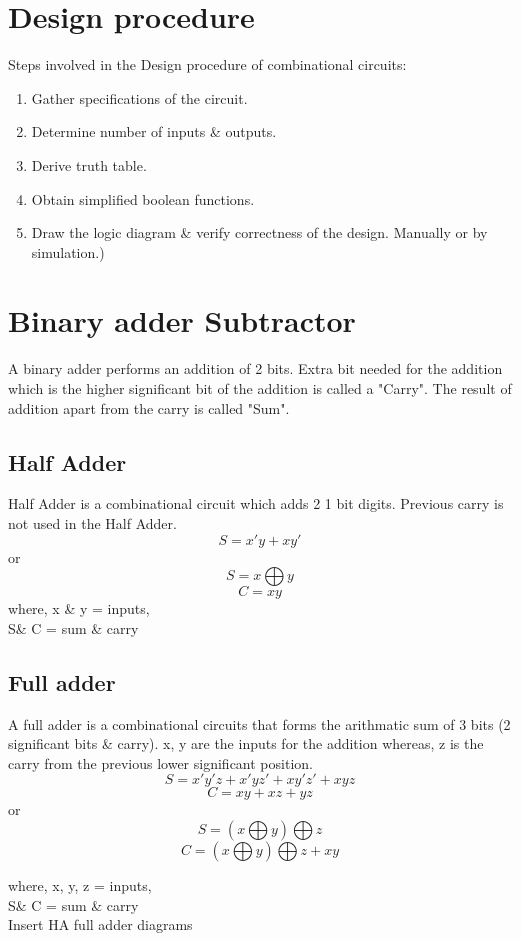 \section{Design procedure}
Steps involved in the Design procedure of combinational circuits: 
\begin{enumerate}
    \item Gather specifications of the circuit. 
    \item Determine number of inputs \& outputs. 
    \item Derive truth table. 
    \item Obtain simplified boolean functions. 
    \item Draw the logic diagram \& verify correctness of the design. Manually or by simulation.) 
\end{enumerate}

\section{Binary adder Subtractor}
A binary adder performs an addition of 2 bits. Extra bit needed for the addition which is the higher significant bit of the addition is called a "Carry". The result of addition apart from the carry is called "Sum". 

\subsection{Half Adder}
Half Adder is a combinational circuit which adds 2 1 bit digits. Previous carry is not used in the Half Adder.\\
\[ S = x'y + xy'\]  or \[ S = x \bigoplus y \]
\[C = xy \]
where, x \& y = inputs,\\ S\& C = sum \& carry 


\subsection{Full adder}
A full adder is a combinational circuits that forms the arithmatic sum of 3 bits (2 significant bits \& carry). x, y are the inputs for the addition whereas, z is the carry from the previous lower significant position. 
\[ S = x'y'z + x'yz' + xy'z' + xyz \] 
\[ C = xy + xz + yz \] 
or 
\[ S = (x \bigoplus y) \bigoplus z \] 
\[ C = (x \bigoplus y) \bigoplus z + xy\] 

where, x, y, z = inputs,\\ S\& C = sum \& carry \\
Insert HA full adder diagrams


